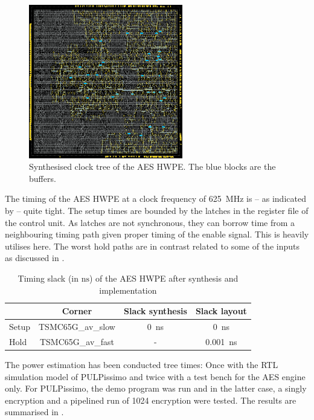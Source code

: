 \documentclass[a4paper, 12pt]{article}
\begin{document}
\begin{figure} [h!]
	\centering
	\includegraphics[width=0.6\textwidth]{clock_tree.png}
	\caption{Synthesised clock tree of the AES HWPE. The blue blocks are the buffers.}
	\label{fig:clock-tree}
\end{figure}

The timing of the AES HWPE at a clock frequency of \SI{625}{MHz} is -- as indicated by  -- quite tight. The setup times are bounded by the latches in the register file of the control unit. As latches are not synchronous, they can borrow time from a neighbouring timing path given proper timing of the enable signal. This is heavily utilises here. The worst hold paths are in contrast related to some of the inputs as discussed in .

\begin{table}[h]
    \centering
    \begin{tabular}{l|c c c}
        \toprule
         & Corner &  Slack synthesis & Slack layout \\
        \midrule
		Setup & TSMC65G\_av\_slow & \SI{0}{ns} & \SI{0}{ns} \\ 
		Hold & TSMC65G\_av\_fast & - & \SI{0.001}{ns} \\ 
        \bottomrule
    \end{tabular}
	\caption{Timing slack (in $\textrm{ns}$) of the AES HWPE after synthesis and implementation}
	\label{tab:results-timing}
\end{table}

The power estimation has been conducted tree times: Once with the RTL simulation model of PULPissimo and twice with a test bench for the AES engine only. For PULPissimo, the demo program was run and in the latter case, a singly encryption and a pipelined run of 1024 encryption were tested. The results are summarised in .
\end{document}
